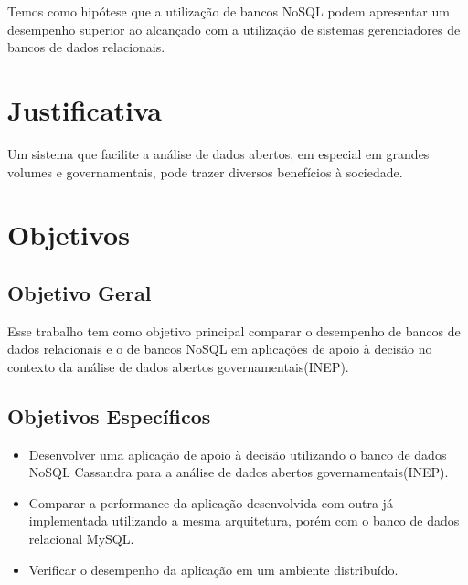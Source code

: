 Temos como hipótese que a utilização de bancos NoSQL podem apresentar um desempenho superior ao alcançado com a utilização de sistemas gerenciadores de bancos de dados relacionais.

\section{Justificativa}
Um sistema que facilite a análise de dados abertos, em especial em grandes volumes e governamentais, pode trazer diversos benefícios à sociedade.

\section{Objetivos}

\subsection{Objetivo Geral}
Esse trabalho tem como objetivo principal comparar o desempenho de bancos de dados relacionais e o de bancos NoSQL em aplicações de apoio à decisão no contexto da análise de dados abertos governamentais(INEP).

\subsection{Objetivos Específicos}
\begin{itemize}
		\item Desenvolver uma aplicação de apoio à decisão utilizando o banco de dados NoSQL Cassandra para a análise de dados abertos governamentais(INEP).
		
		\item Comparar a performance da aplicação desenvolvida com outra já implementada utilizando a mesma arquitetura, porém com o banco de dados relacional MySQL.
		
		\item Verificar o desempenho da aplicação em um ambiente distribuído.
\end{itemize}






